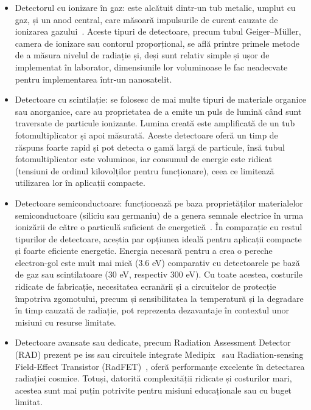 \documentclass[12pt,a4paper]{report}
\begin{document}
\begin{itemize}
    \item Detectorul cu ionizare în gaz: este alcătuit dintr-un tub metalic, umplut cu gaz, și un anod central, care măsoară impulsurile de curent cauzate de ionizarea gazului~\cite{gaseours_detectors}. Aceste tipuri de detectoare, precum tubul Geiger–Müller, camera de ionizare sau contorul proporțional, se află printre primele metode de a măsura nivelul de radiație și, deși sunt relativ simple și ușor de implementat în laborator, dimensiunile lor voluminoase le fac neadecvate pentru implementarea într-un nanosatelit.
    \item Detectoare cu scintilație: se folosesc de mai multe tipuri de materiale organice sau anorganice, care au proprietatea de a emite un puls de lumină când sunt traversate de particule ionizante. Lumina creată este amplificată de un tub fotomultiplicator și apoi măsurată. Aceste detectoare oferă un timp de răspuns foarte rapid și pot detecta o gamă largă de particule, însă tubul fotomultiplicator este voluminos, iar consumul de energie este ridicat (tensiuni de ordinul kilovolților pentru funcționare), ceea ce limitează utilizarea lor în aplicații compacte.
    \item Detectoare semiconductoare: funcționează pe baza proprietăților materialelor semiconductoare (siliciu sau germaniu) de a genera semnale electrice în urma ionizării de către o particulă suficient de energetică~\cite{silicon_detectors}. În comparație cu restul tipurilor de detectoare, aceștia par opțiunea ideală pentru aplicații compacte și foarte eficiente energetic. Energia necesară pentru a crea o pereche electron-gol este mult mai mică (3.6 eV) comparativ cu detectoarele pe bază de gaz sau scintilatoare (30 eV, respectiv 300 eV). Cu toate acestea, costurile ridicate de fabricație, necesitatea ecranării și a circuitelor de protecție împotriva zgomotului, precum și sensibilitatea la temperatură și la degradare în timp cauzată de radiație, pot reprezenta dezavantaje în contextul unor misiuni cu resurse limitate.
    \item Detectoare avansate sau dedicate, precum Radiation Assessment Detector (RAD) prezent pe \gls{iss} sau circuitele integrate Medipix~\cite{medipix} sau Radiation-sensing Field-Effect Transistor (RadFET)~\cite{radfet}, oferă performanțe excelente în detectarea radiației cosmice. Totuși, datorită complexității ridicate și costurilor mari, acestea sunt mai puțin potrivite pentru misiuni educaționale sau cu buget limitat.
\end{itemize}
\end{document}
